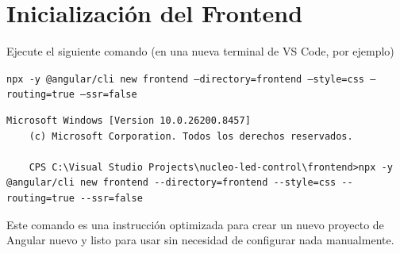 \documentclass[
10pt, %
a4paper, %
oneside, %
headinclude,footinclude, %
BCOR5mm, %
]{scrartcl}
\begin{document}
\newpage

\section{Inicialización del Frontend}

Ejecute el siguiente comando (en una nueva terminal de VS Code, por ejemplo)

\texttt{npx -y @angular/cli new frontend --directory=frontend --style=css --routing=true --ssr=false}
\begin{lstlisting}[language=DOS]
	Microsoft Windows [Version 10.0.26200.8457]
	(c) Microsoft Corporation. Todos los derechos reservados.
	
	CPS C:\Visual Studio Projects\nucleo-led-control\frontend>npx -y @angular/cli new frontend --directory=frontend --style=css --routing=true --ssr=false
\end{lstlisting}

Este comando es una instrucción optimizada para crear un nuevo proyecto de Angular nuevo y listo para usar sin necesidad de configurar nada manualmente.
\end{document}
